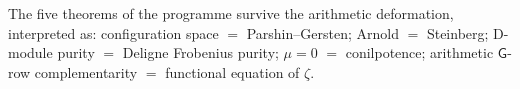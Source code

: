 The five theorems of the programme survive the arithmetic
deformation, interpreted as: configuration space \(=\)
Parshin--Gersten; Arnold \(=\) Steinberg; D-module purity \(=\)
Deligne Frobenius purity; \(\mu=0\) \(=\) conilpotence; arithmetic
\(\mathsf{G}\)-row complementarity \(=\) functional equation of
\(\zeta\).

